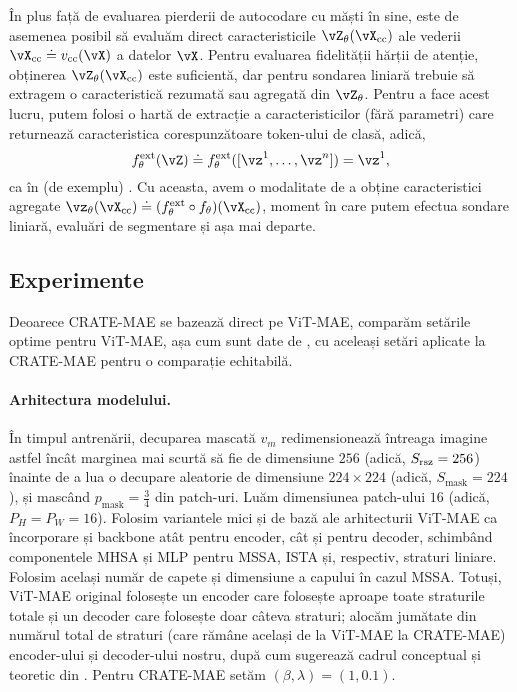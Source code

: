 \documentclass[../../book-main_ro.tex]{subfiles}
\begin{document}
În plus față de evaluarea pierderii de autocodare cu măști în sine, este de asemenea posibil să evaluăm direct caracteristicile \(\vZ_{\theta}(\vX_{\cc})\) ale vederii \(\vX_{\cc} \doteq v_{\cc}(\vX)\) a datelor \(\vX\). Pentru evaluarea fidelității hărții de atenție, obținerea \(\vZ_{\theta}(\vX_{\cc})\) este suficientă, dar pentru sondarea liniară trebuie să extragem o caracteristică rezumată sau agregată din \(\vZ_{\theta}\). Pentru a face acest lucru, putem folosi o hartă de extracție a caracteristicilor (fără parametri) care returnează caracteristica corespunzătoare token-ului de clasă, adică,
\begin{equation}
    f_{\theta}^{\ext}(\vZ) \doteq f_{\theta}^{\ext}([\vz^{1}, \dots, \vz^{n}]) = \vz^{1},
\end{equation}
ca în (de exemplu) . Cu aceasta, avem o modalitate de a obține caracteristici agregate \(\vz_{\theta}(\vX_{\cc}) \doteq (f_{\theta}^{\ext} \circ f_{\theta})(\vX_{\cc})\), moment în care putem efectua sondare liniară, evaluări de segmentare și așa mai departe.

\subsection{Experimente}\label{sub:image_completion_experiments}

Deoarece CRATE-MAE se bazează direct pe ViT-MAE, comparăm setările optime pentru ViT-MAE, așa cum sunt date de \citep{he2022masked}, cu aceleași setări aplicate la CRATE-MAE pentru o comparație echitabilă.

\paragraph{Arhitectura modelului.} În timpul antrenării, decuparea mascată \(v_{m}\) redimensionează întreaga imagine astfel încât marginea mai scurtă să fie de dimensiune \(256\) (adică, \(S_{\mathrm{rsz}} = 256\)) înainte de a lua o decupare aleatorie de dimensiune \(224 \times 224\) (adică, \(S_{\mathrm{mask}} = 224\)), și mascând \(p_{\mathrm{mask}} = \frac{3}{4}\) din patch-uri. Luăm dimensiunea patch-ului \(16\) (adică, \(P_{H} = P_{W} = 16\)). Folosim variantele mici și de bază ale arhitecturii ViT-MAE ca încorporare și backbone atât pentru encoder, cât și pentru decoder, schimbând componentele MHSA și MLP pentru MSSA, ISTA și, respectiv, straturi liniare. Folosim același număr de capete și dimensiune a capului în cazul MSSA. Totuși, ViT-MAE original folosește un encoder care folosește aproape toate straturile totale și un decoder care folosește doar câteva straturi; alocăm jumătate din numărul total de straturi (care rămâne același de la ViT-MAE la CRATE-MAE) encoder-ului și decoder-ului nostru, după cum sugerează cadrul conceptual și teoretic din . Pentru CRATE-MAE setăm \((\beta, \lambda) = (1, 0.1)\).
\end{document}
